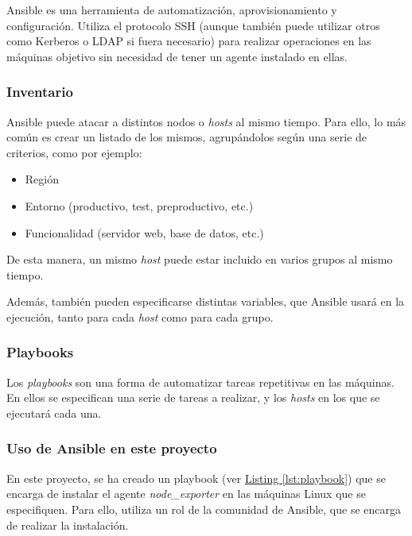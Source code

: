 Ansible\cite{ansible} es una herramienta de automatización, aprovisionamiento y configuración. Utiliza el protocolo SSH (aunque también puede utilizar otros como Kerberos o LDAP si fuera necesario) para realizar operaciones en las máquinas objetivo sin necesidad de tener un agente instalado en ellas.
\subsubsection{Inventario}
Ansible puede atacar a distintos nodos o \textit{hosts} al mismo tiempo. Para ello, lo más común es crear un listado de los mismos, agrupándolos según una serie de criterios, como por ejemplo:
\begin{itemize}
    \item Región
    \item Entorno (productivo, test, preproductivo, etc.)
    \item Funcionalidad (servidor web, base de datos, etc.)
\end{itemize}
De esta manera, un mismo \textit{host} puede estar incluido en varios grupos al mismo tiempo.

Además, también pueden especificarse distintas variables, que Ansible usará en la ejecución, tanto para cada \textit{host} como para cada grupo.

\subsubsection{Playbooks}
Los \textit{playbooks} son una forma de automatizar tareas repetitivas en las máquinas. En ellos se especifican una serie de tareas a realizar, y los \textit{hosts} en los que se ejecutará cada una. 

\subsubsection*{Uso de Ansible en este proyecto}
En este proyecto, se ha creado un playbook (ver \hyperref[lst:playbook]{Listing \ref{lst:playbook}}) que se encarga de instalar el agente \textit{node\_exporter} en las máquinas Linux que se especifiquen. Para ello, utiliza un rol de la comunidad de Ansible, que se encarga de realizar la instalación.

